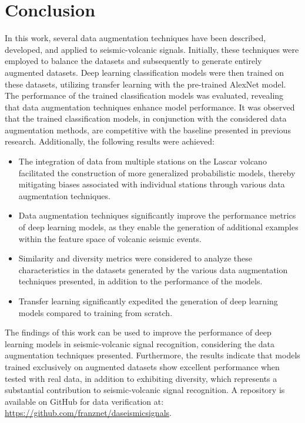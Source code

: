 \documentclass[journal]{IEEEtran}
\begin{document}
\section{Conclusion}\label{conclusion}
In this work, several data augmentation techniques have been described, developed, and applied to seismic-volcanic signals. Initially, these techniques were employed to balance the datasets and subsequently to generate entirely augmented datasets. Deep learning classification models were then trained on these datasets, utilizing transfer learning with the pre-trained AlexNet model.
The performance of the trained classification models was evaluated, revealing that data augmentation techniques enhance model performance.
It was observed that the trained classification models, in conjunction with the considered data augmentation methods, are competitive with the baseline presented in previous research. Additionally, the following results were achieved:
\begin{itemize} 
\item The integration of data from multiple stations on the Lascar volcano facilitated the construction of more generalized probabilistic models, thereby mitigating biases associated with individual stations through various data augmentation techniques.
\item Data augmentation techniques significantly improve the performance metrics of deep learning models, as they enable the generation of additional examples within the feature space of volcanic seismic events.
\item Similarity and diversity metrics were considered to analyze these characteristics in the datasets generated by the various data augmentation techniques presented, in addition to the performance of the models.
\item Transfer learning significantly expedited the generation of deep learning models compared to training from scratch. 
\end{itemize}
The findings of this work can be used to improve the performance of deep learning models in seismic-volcanic signal recognition, considering the data augmentation techniques presented. Furthermore, the results indicate that models trained exclusively on augmented datasets show excellent performance when tested with real data, in addition to exhibiting diversity, which represents a substantial contribution to seismic-volcanic signal recognition.
A repository is available on GitHub for data verification at: \href{https://github.com/franznet/daseismicsignals}{\color{blue}https://github.com/franznet/daseismicsignals}.
\end{document}
